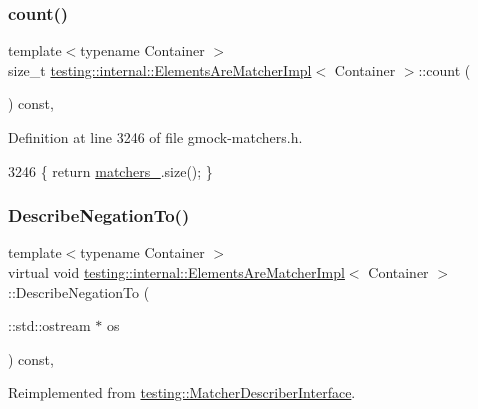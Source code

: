 \subsubsection{\texorpdfstring{count()}{count()}}
{\footnotesize\ttfamily template$<$typename Container $>$ \\
size\+\_\+t \hyperlink{classtesting_1_1internal_1_1ElementsAreMatcherImpl}{testing\+::internal\+::\+Elements\+Are\+Matcher\+Impl}$<$ Container $>$\+::count (\begin{DoxyParamCaption}{ }\end{DoxyParamCaption}) const\hspace{0.3cm}{\ttfamily [inline]}, {\ttfamily [private]}}



Definition at line 3246 of file gmock-\/matchers.\+h.


\begin{DoxyCode}
3246 \{ \textcolor{keywordflow}{return} \hyperlink{classtesting_1_1internal_1_1ElementsAreMatcherImpl_aefcf41a7cfe74274c68272a67fb94e9f}{matchers\_}.size(); \}
\end{DoxyCode}
\mbox{\label{classtesting_1_1internal_1_1ElementsAreMatcherImpl_ab8485a836eb7ffabc43b05187e58616d}} 
\subsubsection{\texorpdfstring{Describe\+Negation\+To()}{DescribeNegationTo()}}
{\footnotesize\ttfamily template$<$typename Container $>$ \\
virtual void \hyperlink{classtesting_1_1internal_1_1ElementsAreMatcherImpl}{testing\+::internal\+::\+Elements\+Are\+Matcher\+Impl}$<$ Container $>$\+::Describe\+Negation\+To (\begin{DoxyParamCaption}\item[{\+::std\+::ostream $\ast$}]{os }\end{DoxyParamCaption}) const\hspace{0.3cm}{\ttfamily [inline]}, {\ttfamily [virtual]}}



Reimplemented from \hyperlink{classtesting_1_1MatcherDescriberInterface_a2071afbc47097c4d1c0064275af34db0}{testing\+::\+Matcher\+Describer\+Interface}.



